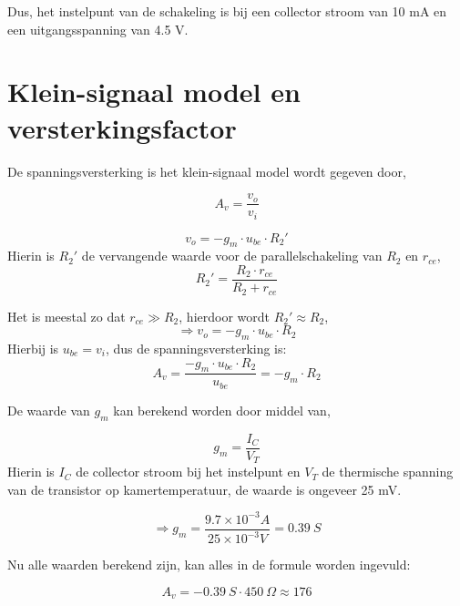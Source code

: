 \documentclass[11pt]{article}
\begin{document}
\noindent Dus, het instelpunt van de schakeling is bij een collector stroom van 10 mA en een uitgangsspanning van 4.5 V.

\newpage
\section{Klein-signaal model en versterkingsfactor}

De spanningsversterking is het klein-signaal model wordt gegeven door,

\begin{equation}
A_v=\frac{v_o}{v_i}
\end{equation}

\begin{equation}
v_o=-g_m\cdot u_{be}\cdot R_2'
\end{equation}
Hierin is $R_2'$ de vervangende waarde voor de parallelschakeling van $R_2$ en $r_{ce}$,
$$R_2'=\frac{R_2\cdot r_{ce}}{R_2+r_{ce}}$$

\noindent Het is meestal zo dat $r_{ce}\gg R_2$, hierdoor wordt $R_2'\approx R_2$,
$$\Rightarrow v_o=-g_m\cdot u_{be}\cdot R_2$$
Hierbij is $u_{be}=v_i$, dus de spanningsversterking is:
$$A_v=\frac{-g_m\cdot u_{be}\cdot R_2}{u_{be}}=-g_m\cdot R_2$$

\noindent De waarde van $g_m$ kan berekend worden door middel van,

\begin{equation}
g_m=\frac{I_C}{V_T}
\end{equation}
Hierin is $I_C$ de collector stroom bij het instelpunt en $V_T$ de thermische spanning van de transistor op kamertemperatuur, de waarde is ongeveer 25 mV.

$$\Rightarrow g_m=\frac{9.7\times 10^{-3}A}{25\times 10^{-3}V}= 0.39 \: S$$

Nu alle waarden berekend zijn, kan alles in de formule worden ingevuld:

$$A_v= -0.39 \: S\cdot 450 \: \Omega\approx 176 $$
\end{document}
